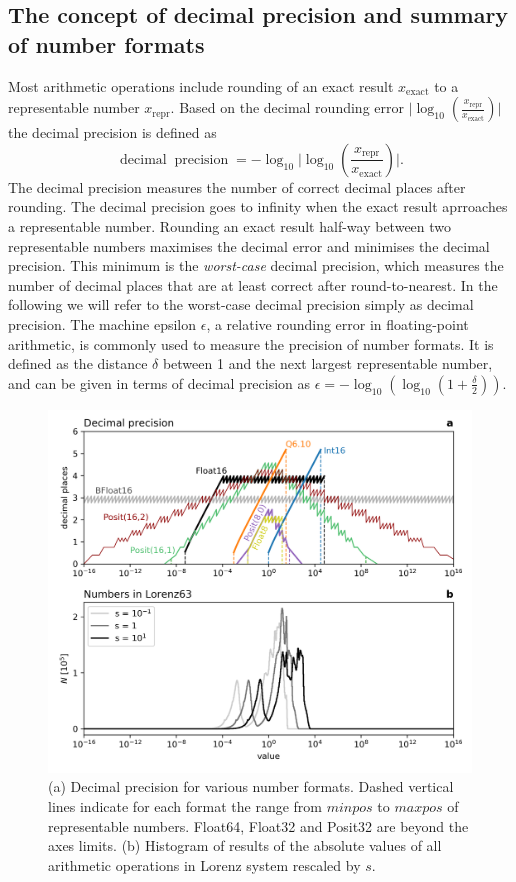 \documentclass[draft]{agujournal2019}
\newcommand{\op}{\operatorname}
\begin{document}
\subsection{The concept of decimal precision and summary of number formats}
\label{sec:decprec}

Most arithmetic operations include rounding of an exact result $x_\text{exact}$
to a representable number $x_\text{repr}$. Based on the decimal rounding error
$\vert \log_{10}( \tfrac{x_\text{repr}}{x_\text{exact}} ) \vert$ the decimal precision
is defined as \cite{Gustafson2017, Klower2019}
\begin{equation}
\op{decimal} \op{precision} = -\log_{10} \vert \log_{10}( \frac{x_\text{repr}}{x_\text{exact}} ) \vert.
\end{equation}
The decimal precision measures the number of correct decimal places after rounding.
The decimal precision goes to infinity when the exact result aprroaches a
representable number. Rounding an exact result half-way between two representable
numbers maximises the decimal error and minimises the decimal precision.
This minimum is the \emph{worst-case} decimal precision, which measures the number
of decimal places that are at least correct after round-to-nearest. In the following
we will refer to the worst-case decimal precision simply as decimal precision.
The machine epsilon $\epsilon$, a relative rounding error in floating-point arithmetic,
is commonly used to measure the precision of number formats. It is defined as the
distance $\delta$ between 1 and the next largest representable number, and can be
given in terms of decimal precision as $\epsilon = -\log_{10} ( \log_{10}( 1 + \tfrac{\delta}{2} ))$.

\begin{figure}[htbp]
\includegraphics[width=1\textwidth]{decimal_precision.png}
\caption{(a) Decimal precision for various number formats. Dashed vertical lines
indicate for each format the range from $minpos$ to $maxpos$ of representable numbers.
Float64, Float32 and Posit32 are beyond the axes limits. (b) Histogram of results
of the absolute values of all arithmetic operations in Lorenz system rescaled by $s$.}
\label{fig:dec_prec}
\end{figure}
\end{document}
